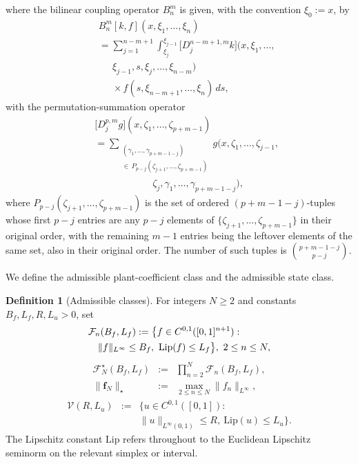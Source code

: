 \documentclass[twocolumn,amsthm]{autart}
\newcommand{\Linf}{L^\infty}
\newcommand{\Lip}{\mathrm{Lip}}
\theoremstyle{plain}
\theoremstyle{definition}
\newtheorem{definition}{Definition}
\begin{document}
where the bilinear coupling operator $B_n^m$ is given, with the convention $\xi_0 := x$, by
\begin{eqnarray}
&& B_n^m[k,f](x,\xi_1,\ldots,\xi_n) \nonumber \\
&& = \sum_{j=1}^{n-m+1}\int_{\xi_j}^{\xi_{j-1}}
\bigl[D_j^{n-m+1,m} k\bigr](x,\xi_1,\ldots, \nonumber \\
&& \quad\ \ \xi_{j-1},s,\xi_j,\ldots,\xi_{n-m}) \nonumber \\
&& \quad\ \ \times f(s,\xi_{n-m+1},\ldots,\xi_n)\,ds,
\label{eq:Bdef}
\end{eqnarray}
with the permutation-summation operator
\begin{eqnarray}
&& \bigl[D_j^{p,m}g\bigr](x,\zeta_1,\ldots,\zeta_{p+m-1}) \nonumber \\
&& = \!\!\!\sum_{\substack{(\gamma_1,\ldots,\gamma_{p+m-1-j}) \\ \in\, P_{p-j}(\zeta_{j+1},\ldots,\zeta_{p+m-1})}}\!\!\!
g(x,\zeta_1,\ldots,\zeta_{j-1}, \nonumber \\
&& \qquad\qquad\qquad \zeta_j,\gamma_1,\ldots,\gamma_{p+m-1-j}),
\label{eq:Ddef}
\end{eqnarray}
where $P_{p-j}(\zeta_{j+1},\ldots,\zeta_{p+m-1})$ is the set of ordered $(p+m-1-j)$-tuples whose first $p-j$ entries are any $p-j$ elements of $\{\zeta_{j+1},\ldots,\zeta_{p+m-1}\}$ in their original order, with the remaining $m-1$ entries being the leftover elements of the same set, also in their original order. The number of such tuples is $\binom{p+m-1-j}{p-j}$.

We define the admissible plant-coefficient class and the admissible state class.

\begin{definition}[Admissible classes]
\label{def:classes}
For integers $N\ge 2$ and constants $B_f, L_f, R, L_u > 0$, set
\begin{eqnarray}
\lefteqn{\mathcal{F}_n(B_f,L_f) := \bigl\{ f \in C^{0,1}([0,1]^{n+1}) :} \nonumber \\
&& \|f\|_{\Linf} \le B_f,\ \Lip(f) \le L_f \bigr\}, \ 2\le n\le N,
\label{eq:Fnclass}
\end{eqnarray}
\begin{eqnarray}
\mathcal{F}_N^\star(B_f,L_f) &:=& \prod_{n=2}^N \mathcal{F}_n(B_f,L_f), \nonumber \\
\|\mathbf{f}_N\|_\star &:=& \max_{2\le n\le N} \|f_n\|_{\Linf},
\label{eq:Fclass}
\end{eqnarray}
\begin{eqnarray}
\mathcal{V}(R,L_u) &:=&
\bigl\{ u \in C^{0,1}([0,1]) : \nonumber \\
&& \|u\|_{\Linf(0,1)} \le R,\ \Lip(u) \le L_u \bigr\}.
\label{eq:Vclass}
\end{eqnarray}
The Lipschitz constant $\Lip$ refers throughout to the Euclidean Lipschitz seminorm on the relevant simplex or interval.
\end{definition}
\end{document}
